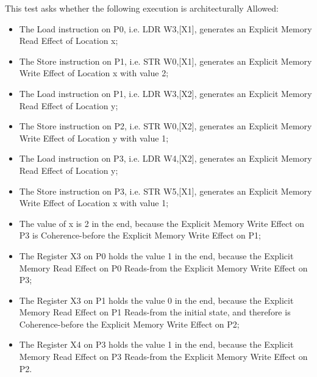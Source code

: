 This test asks whether the following execution is architecturally Allowed:

\begin{itemize}
  \item The Load instruction on P0, i.e. LDR W3,[X1], generates an Explicit Memory Read Effect of Location x;
  \item The Store instruction on P1, i.e. STR W0,[X1], generates an Explicit Memory Write Effect of Location x with value 2;
  \item The Load instruction on P1, i.e. LDR W3,[X2], generates an Explicit Memory Read Effect of Location y;
  \item The Store instruction on P2, i.e. STR W0,[X2], generates an Explicit Memory Write Effect of Location y with value 1;
  \item The Load instruction on P3, i.e. LDR W4,[X2], generates an Explicit Memory Read Effect of Location y;
  \item The Store instruction on P3, i.e. STR W5,[X1], generates an Explicit Memory Write Effect of Location x with value 1;
  \item The value of x is 2 in the end, because the Explicit Memory Write Effect on P3 is Coherence-before the Explicit Memory Write Effect on P1;
  \item The Register X3 on P0 holds the value 1 in the end, because the Explicit Memory Read Effect on P0 Reads-from the Explicit Memory Write Effect on P3;
  \item The Register X3 on P1 holds the value 0 in the end, because the Explicit Memory Read Effect on P1 Reads-from the initial state, and therefore is Coherence-before the Explicit Memory Write Effect on P2;
  \item The Register X4 on P3 holds the value 1 in the end, because the Explicit Memory Read Effect on P3 Reads-from the Explicit Memory Write Effect on P2.
\end{itemize}
